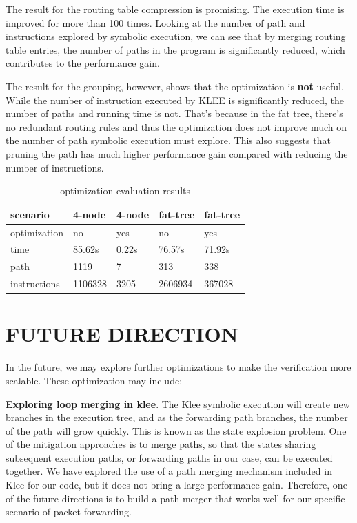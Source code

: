 \documentclass[letterpaper, 10 pt, conference]{ieeeconf}  %
\begin{document}
The result for the routing table compression is promising. The execution time is improved for more than 100 times. Looking at the number of path and instructions explored by symbolic execution, we can see that by merging routing table entries, the number of paths in the program is significantly reduced, which contributes to the performance gain.

The result for the grouping, however, shows that the optimization is \textbf{not} useful. While the number of instruction executed by KLEE is significantly reduced, the number of paths and running time is not. That's because in the fat tree, there's no redundant routing rules and thus the optimization does not improve much on the number of path symbolic execution must explore. This also suggests that pruning the path has much higher performance gain compared with reducing the number of instructions.
\begin{table}[!ht]
	\centering
	\begin{tabular}{|l|l|l|l|l|}
		\hline
		scenario & 4-node & 4-node & fat-tree & fat-tree  \\ \hline
		optimization & no & yes & no & yes  \\ \hline
		time & 85.62s & 0.22s & 76.57s & 71.92s \\ \hline
		path & 1119 & 7 & 313 & 338 \\ \hline
		instructions & 1106328 & 3205 & 2606934 & 367028 \\ \hline
	\end{tabular}
	\caption{optimization evaluation results}
	\label{tab:eval-opt}
\end{table}

\section{FUTURE DIRECTION}\label{sec:fd}

In the future, we may explore further optimizations to make the verification more scalable. These optimization may include:

\textbf{Exploring loop merging in klee}. 
The Klee symbolic execution will create new branches in the execution tree, and as the forwarding path branches, the number of the path will grow quickly. 
This is known as the state explosion problem. 
One of the mitigation approaches is to merge paths, so that the states sharing subsequent execution paths, or forwarding paths in our case, can be executed together. 
We have explored the use of a path merging mechanism included in Klee for our code, but it does not bring a large performance gain. 
Therefore, one of the future directions is to build a path merger that works well for our specific scenario of packet forwarding. 
\end{document}
